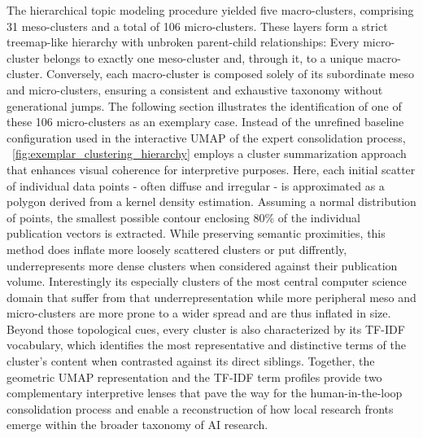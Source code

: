 \documentclass{article}
\begin{document}
	The hierarchical topic modeling procedure yielded five macro-clusters, comprising 31 meso-clusters and a total of 106 micro-clusters. These layers form a strict treemap-like hierarchy with unbroken parent-child relationships: Every micro-cluster belongs to exactly one meso-cluster and, through it, to a unique macro-cluster. Conversely, each macro-cluster is composed solely of its subordinate meso and micro-clusters, ensuring a consistent and exhaustive taxonomy without generational jumps. The following section illustrates the identification of one of these 106 micro-clusters as an exemplary case. Instead of the unrefined baseline configuration used in the interactive UMAP of the expert consolidation process, \figurename~\ref{fig:exemplar_clustering_hierarchy} employs a cluster summarization approach that enhances visual coherence for interpretive purposes. Here, each initial scatter of individual data points - often diffuse and irregular - is approximated as a polygon derived from a kernel density estimation. Assuming a normal distribution of points, the smallest possible contour enclosing 80\% of the individual publication vectors is extracted. While preserving semantic proximities, this method does inflate more loosely scattered clusters or put diffrently, underrepresents more dense clusters when considered against their publication volume. Interestingly its especially clusters of the most central computer science domain that suffer from that underrepresentation while more peripheral meso and micro-clusters are more prone to a wider spread and are thus inflated in size. Beyond those topological cues, every cluster is also characterized by its TF-IDF vocabulary, which identifies the most representative and distinctive terms of the cluster’s content when contrasted against its direct siblings. Together, the geometric UMAP representation and the TF-IDF term profiles provide two complementary interpretive lenses that pave the way for the human-in-the-loop consolidation process and enable a reconstruction of how local research fronts emerge within the broader taxonomy of AI research.
	
\end{document}
